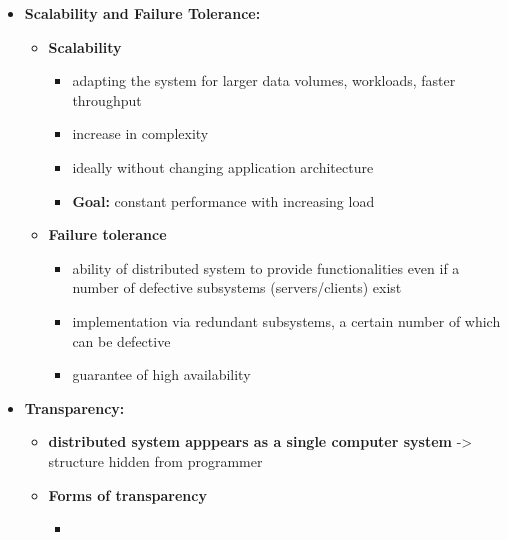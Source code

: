 \documentclass[ieeetran]{article}
\begin{document}
\begin{itemize}
\begin{itemize}
	\end{itemize}
\item \textbf{Scalability and Failure Tolerance:}
	\begin{itemize}
	  \item \textbf{Scalability}
		  \begin{itemize}
		    \item adapting the system for larger data volumes, workloads, faster throughput
		\item increase in complexity
		\item ideally without changing application architecture
		\item \textbf{Goal:} constant performance with increasing load
		  \end{itemize}

\item \textbf{Failure tolerance}
	\begin{itemize}
	  \item ability of distributed system to provide functionalities even if a number of defective subsystems (servers/clients) exist
\item implementation via redundant subsystems, a certain number of which can be defective
\item guarantee of high availability
	\end{itemize}
	\end{itemize}

\item \textbf{Transparency:}
	\begin{itemize}
	  \item \textbf{distributed system apppears as a single computer system} -> structure hidden from programmer
	\item \textbf{Forms of transparency}
		\begin{itemize}
		  \item 
		\end{itemize}
	\end{itemize}
\end{itemize}





\end{document}
